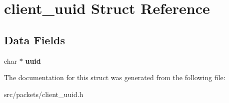 \hypertarget{structclient__uuid}{}\section{client\+\_\+uuid Struct Reference}
\label{structclient__uuid}
\subsection*{Data Fields}
\begin{DoxyCompactItemize}
\item 
\hypertarget{structclient__uuid_ad532326cb16d80d91b69c23f2c0f8c4c}{}char $\ast$ {\bfseries uuid}\label{structclient__uuid_ad532326cb16d80d91b69c23f2c0f8c4c}

\end{DoxyCompactItemize}


The documentation for this struct was generated from the following file\+:\begin{DoxyCompactItemize}
\item 
src/packets/client\+\_\+uuid.\+h\end{DoxyCompactItemize}
